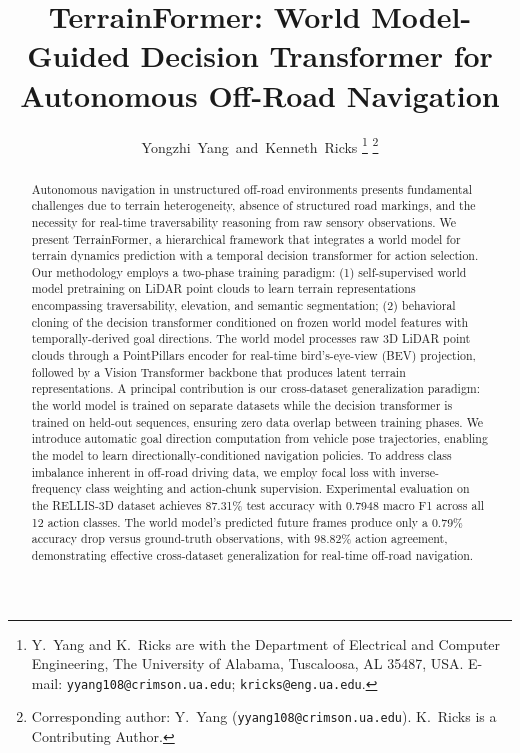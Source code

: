 \documentclass[journal]{IEEEtran}
\begin{document}
\title{TerrainFormer: World Model-Guided Decision Transformer for Autonomous Off-Road Navigation}

\author{Yongzhi~Yang~and~Kenneth~Ricks%
  \thanks{Y.~Yang and K.~Ricks are with the Department of Electrical
    and Computer Engineering, The University of Alabama,
    Tuscaloosa, AL 35487, USA\@.
    E-mail: \texttt{yyang108@crimson.ua.edu}; \texttt{kricks@eng.ua.edu}.}%
  \thanks{Corresponding author: Y.~Yang
    (\texttt{yyang108@crimson.ua.edu}).
    K.~Ricks is a Contributing Author.}%
}

\maketitle

\begin{abstract}
Autonomous navigation in unstructured off-road environments presents fundamental challenges due to terrain heterogeneity, absence of structured road markings, and the necessity for real-time traversability reasoning from raw sensory observations. We present TerrainFormer, a hierarchical framework that integrates a world model for terrain dynamics prediction with a temporal decision transformer for action selection. Our methodology employs a two-phase training paradigm: (1) self-supervised world model pretraining on LiDAR point clouds to learn terrain representations encompassing traversability, elevation, and semantic segmentation; (2) behavioral cloning of the decision transformer conditioned on frozen world model features with temporally-derived goal directions. The world model processes raw 3D LiDAR point clouds through a PointPillars encoder for real-time bird's-eye-view (BEV) projection, followed by a Vision Transformer backbone that produces latent terrain representations. A principal contribution is our cross-dataset generalization paradigm: the world model is trained on separate datasets while the decision transformer is trained on held-out sequences, ensuring zero data overlap between training phases. We introduce automatic goal direction computation from vehicle pose trajectories, enabling the model to learn directionally-conditioned navigation policies. To address class imbalance inherent in off-road driving data, we employ focal loss with inverse-frequency class weighting and action-chunk supervision. Experimental evaluation on the RELLIS-3D dataset achieves 87.31\% test accuracy with 0.7948 macro F1 across all 12 action classes. The world model's predicted future frames produce only a 0.79\% accuracy drop versus ground-truth observations, with 98.82\% action agreement, demonstrating effective cross-dataset generalization for real-time off-road navigation.
\end{abstract}
\end{document}
